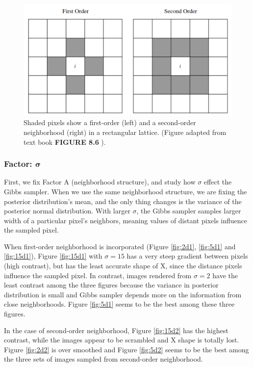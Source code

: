 \begin{figure}[h]
    \centering
    \includegraphics[scale=0.5]{./img/orderillus.png}
    \caption{Shaded pixels show a first-order (left) and a second-order neighborhood (right) in a rectangular lattice. (Figure adapted from text book \textbf{FIGURE 8.6} \cite{Givens}).}
    \label{fig:neiborill}
\end{figure}
\subsubsection{Factor: $\mathbf{\sigma}$}
First, we fix Factor A (neighborhood structure), and study how $\sigma$ effect the Gibbs sampler.
When we use the same neighborhood structure, we are fixing the posterior distribution's mean, and the only thing changes is the variance of the posterior normal distribution.
With larger $\sigma$, the Gibbs sampler samples larger width of a particular pixel's neighbors, meaning values of distant pixels influence the sampled pixel. 

When first-order neighborhood is incorporated (Figure \ref{fig:2d1}, \ref{fig:5d1} and \ref{fig:15d1}), Figure \ref{fig:15d1} with $\sigma=15$ has a very steep gradient between pixels (high contrast), but has the least accurate shape of X, since the distance pixels influence the sampled pixel. 
In contrast, images rendered from $\sigma=2$ have the least contrast among the three figures because the variance in posterior distribution is small and Gibbs sampler depends more on the information from close neighborhoods. 
Figure \ref{fig:5d1} seems to be the best among these three figures. 

In the case of second-order neighborhood, Figure \ref{fig:15d2} has the highest contrast, while the images appear to be scrambled and X shape is totally lost. 
Figure \ref{fig:2d2} is over smoothed and Figure \ref{fig:5d2} seems to be the best among the three sets of images sampled from second-order neighborhood. 

